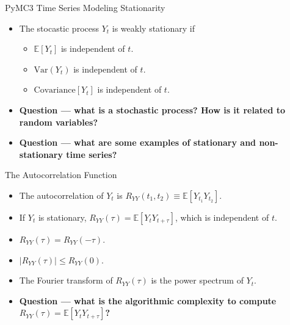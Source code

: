 \documentclass[20pt]{beamer}
\begin{document}
\begin{frame}{PyMC3 Time Series Modeling}
Stationarity
\begin{itemize}
  \item The stocastic process $Y_t$ is weakly stationary if
  \begin{itemize}
    \item $\mathbb{E}[Y_t]$ is independent of $t$.
    \item $\text{Var}(Y_t)$ is independent of $t$.
    \item $\text{Covariance}[Y_t]$ is independent of $t$.
  \end{itemize}

  \item \textbf{Question --- what is a stochastic process? How is it related to random variables?}

  \item \textbf{Question --- what are some examples of stationary and non-stationary time series?}
\end{itemize}

The Autocorrelation Function
\begin{itemize}
  \item The autocorrelation of $Y_t$ is $R_{YY}(t_1, t_2) \equiv \mathbb{E}[Y_{t_1} Y_{t_2}]$.

  \item If $Y_t$ is stationary, $R_{YY}(\tau) = \mathbb{E}[Y_{t} Y_{t+\tau}]$, which is independent of $t$.

  \item $R_{YY}(\tau) = R_{YY}(-\tau)$.

  \item $|R_{YY}(\tau)| \le R_{YY}(0)$.

  \item The Fourier transform of $R_{YY}(\tau)$ is the power spectrum of $Y_t$.

  \item \textbf{Question --- what is the algorithmic complexity to compute $R_{YY}(\tau) = \mathbb{E}[Y_{t} Y_{t+\tau}]$?} 

\end{itemize}
\end{frame}
\end{document}
